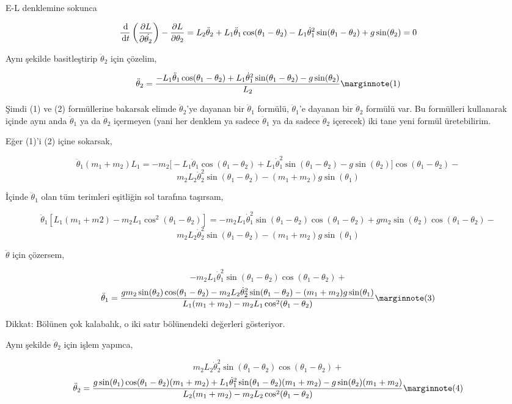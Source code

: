 \documentclass[12pt,fleqn]{article}\usepackage{../../common}
\begin{document}
E-L denklemine sokunca

$$
\frac{\,\mathrm{d}}{\,\mathrm{d} t} \left(
\frac{\partial L}{\partial \dot{\theta_2}} 
\right) - \frac{\partial L}{\partial \theta_2} =  
L_2 \ddot{\theta}_2 + L_1 \ddot{\theta}_1 \cos(\theta_1 - \theta_2) - 
L_1 \dot{\theta}_1^2 \sin(\theta_1 - \theta_2) + g \sin (\theta_2) = 0
$$

Aynı şekilde basitleştirip $\ddot{\theta}_2$ için çözelim,

$$
\ddot{\theta}_2 = 
\frac{
-L_1 \ddot{\theta}_1 \cos(\theta_1-\theta_2) + 
L_1 \dot{\theta}_1^2\sin(\theta_1-\theta_2) - 
g \sin(\theta_2)
}
{L_2}
\mlabel{1}
$$

Şimdi (1) ve (2) formüllerine bakarsak elimde $\ddot{\theta}_2$'ye dayanan bir
$\ddot{\theta}_1$ formülü, $\ddot{\theta}_1$'e dayanan bir $\ddot{\theta}_2$
formülü var. Bu formülleri kullanarak içinde aynı anda $\ddot{\theta}_1$ ya da
$\ddot{\theta}_2$ içermeyen (yani her denklem ya sadece $\ddot{\theta}_1$ ya da
sadece $\ddot{\theta}_2$ içerecek) iki tane yeni formül üretebilirim.

Eğer (1)'i (2) içine sokarsak, 

$$
\ddot{\theta}_1 (m_1 + m_2) L_1 = -m_2 
\big[-L_1\ddot{\theta}_1 \cos(\theta_1-\theta_2) + 
 L_1\dot{\theta}_1^2 \sin(\theta_1-\theta_2) -
 g \sin(\theta_2) \big] \cos(\theta_1-\theta_2)- 
$$
$$
m_2 L_2 \dot{\theta}_2^2 \sin(\theta_1-\theta_2)- 
(m_1 + m_2) g \sin(\theta_1)
$$

İçinde $\ddot{\theta}_1$ olan tüm terimleri eşitliğin sol tarafına taşırsam,

$$
\ddot{\theta}_1 [L_1 (m_1 + m2) - m_2 L_1 \cos^2(\theta_1-\theta_2)] =
-m_2 L_1 \dot{\theta}_1^2 \sin(\theta_1-\theta_2) \cos(\theta_1-\theta_2) + 
g m_2 \sin(\theta_2) \cos(\theta_1-\theta_2) - 
$$
$$
m_2 L_2 \dot{\theta}_2^2 \sin(\theta_1-\theta_2) - 
(m_1 + m_2) g \sin(\theta_1)
$$

$\ddot{\theta}$ için çözersem, 

$$
 -m_2 L_1 \dot{\theta}_1^2 \sin(\theta_1-\theta_2)\cos(\theta_1-\theta_2) + 
$$
$$
\ddot{\theta}_1 = 
\frac{ g m_2 \sin(\theta_2)\cos(\theta_1-\theta_2) -
m_2 L_2 \dot{\theta}_2^2 \sin(\theta_1-\theta_2) - (m_1+m_2)g\sin(\theta_1)
}
{L_1 (m_1+m_2)-m_2L_1\cos^2(\theta_1-\theta_2)}
\mlabel{3}
$$

Dikkat: Bölünen çok kalabalık, o iki satır bölünendeki değerleri
gösteriyor. 

Aynı şekilde $\ddot{\theta}_2$ için işlem yapınca, 

$$
m_2 L_2 \dot{\theta}_2^2 \sin(\theta_1-\theta_2)\cos(\theta_1-\theta_2) + 
$$
$$
\ddot{\theta}_2 = 
\frac{ 
g \sin(\theta_1) \cos(\theta_1-\theta_2)(m_1+m_2) + 
L_1 \dot{\theta}_1^2 \sin(\theta_1-\theta_2)(m_1+m_2) - g\sin(\theta_2) (m_1+m_2)
}
{L_2 (m_1+m_2) - m_2 L_2 \cos^2 (\theta_1-\theta_2)}
\mlabel{4}
$$
\end{document}
